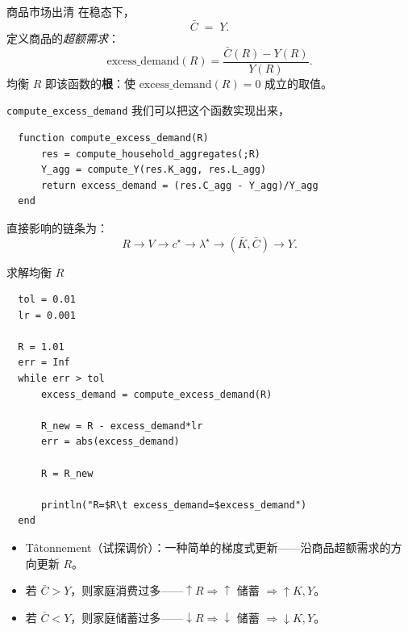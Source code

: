 \documentclass[10pt,aspectratio=169]{beamer}
\begin{document}
\begin{frame}{商品市场出清}
  在稳态下，
  \[
    \bar C \;=\; Y.
  \]
  定义商品的\emph{超额需求}：
  \[
    \text{excess\_demand}(R) = \frac{\bar C(R) - Y(R)}{Y(R)}.
  \]
  均衡 $R$ 即该函数的\textbf{根}：使 $\text{excess\_demand}(R) = 0$ 成立的取值。
\end{frame}

\begin{frame}[fragile]{\texttt{compute\_excess\_demand}}
  我们可以把这个函数实现出来，
  \begin{lstlisting}
  function compute_excess_demand(R)
      res = compute_household_aggregates(;R)
      Y_agg = compute_Y(res.K_agg, res.L_agg)
      return excess_demand = (res.C_agg - Y_agg)/Y_agg
  end
  \end{lstlisting}
  直接影响的链条为：
  \[
    R \to V \to c^\star \to \lambda^\star \to (\bar K, \bar C) \to Y.
  \]
\end{frame}

\begin{frame}[fragile]{求解均衡 $R$}
  \begin{lstlisting}
  tol = 0.01
  lr = 0.001

  R = 1.01
  err = Inf
  while err > tol
      excess_demand = compute_excess_demand(R)

      R_new = R - excess_demand*lr
      err = abs(excess_demand)

      R = R_new

      println("R=$R\t excess_demand=$excess_demand")
  end
  \end{lstlisting}

  \begin{itemize}
    \item Tâtonnement（试探调价）：一种简单的梯度式更新——沿商品超额需求的方向更新 $R$。
    \item 若 $\bar C > Y$，则家庭消费过多——$\uparrow R\Rightarrow \uparrow$ 储蓄 $\Rightarrow \uparrow K, Y$。
    \item 若 $\bar C < Y$，则家庭储蓄过多——$\downarrow R\Rightarrow \downarrow$ 储蓄 $\Rightarrow \downarrow K, Y$。
  \end{itemize}
\end{frame}
\end{document}
